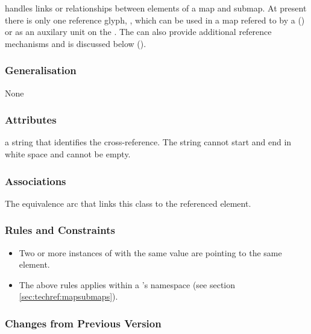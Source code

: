  handles links or relationships between elements of a
map and submap. At present there is only one reference glyph,
, which can be used in a map refered to by a 
() or as an auxilary unit on the . The
 can also provide additional reference mechanisms
and is discussed below ().

\subsubsection{Generalisation}

None

\subsubsection{Attributes}

\begin{attributes}
   a string that identifies the
  cross-reference. The string cannot start and end in white space and
  cannot be empty.
\end{attributes}

\subsubsection{Associations}

\begin{attributes}
   The
  equivalence arc that links this class to the referenced element.
\end{attributes}

\subsubsection{Rules and Constraints}

\begin{itemize}
\item  Two or more instances of  with the
  same  value are pointing to the same element.
\item The above rules applies within a \PDm's namespace (see section \ref{sec:techref:mapsubmaps}).
\end{itemize}

\subsubsection{Changes from Previous Version}

